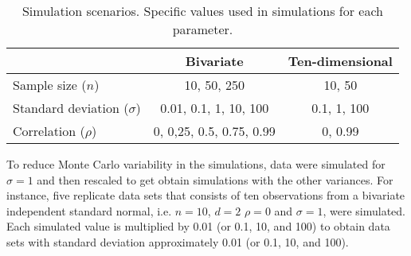 \documentclass[12pt]{article}
\newcommand{\matt}[1]{\textcolor{red}{(matt: #1)}}
\begin{document}

\begin{table}[htbp]
   \centering
   \caption{Simulation scenarios. Specific values used in simulations for each parameter. \label{scen}} 
     \begin{tabular}{lcc} \hline
          &  Bivariate    & Ten-dimensional  \\ \hline
      Sample size   ($n$)   & 10, 50, 250   &  10, 50  \\
      Standard deviation ($\sigma$)  & 0.01, 0.1, 1, 10, 100 & 0.1, 1, 100 \\
      Correlation ($\rho$)   &  0, 0,25, 0.5, 0.75, 0.99  &  0, 0.99 \\ \hline
   \end{tabular}
\end{table}

To reduce Monte Carlo variability in the simulations, data were simulated for $\sigma=1$ and then rescaled to get obtain simulations with the other variances. For instance, five replicate data sets that consists of ten observations from a bivariate independent standard normal, i.e. $n=10$, $d=2$ $\rho=0$ and $\sigma=1$, were simulated. Each simulated value is multiplied by 0.01 (or 0.1, 10, and 100) to obtain data sets with standard deviation approximately 0.01 (or 0.1, 10, and 100).
\end{document}
